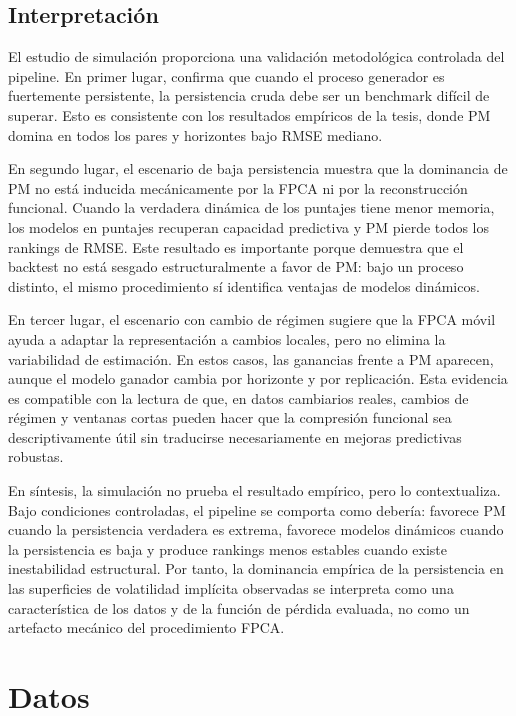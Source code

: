 \documentclass[a4paper,11pt]{article}
\newcommand{\SVIs}{superficies de volatilidad implícita}
\begin{document}
\subsection{Interpretación}

El estudio de simulación proporciona una validación metodológica controlada del pipeline. En primer lugar, confirma que cuando el proceso generador es fuertemente persistente, la persistencia cruda debe ser un benchmark difícil de superar. Esto es consistente con los resultados empíricos de la tesis, donde PM domina en todos los pares y horizontes bajo RMSE mediano.

En segundo lugar, el escenario de baja persistencia muestra que la dominancia de PM no está inducida mecánicamente por la FPCA ni por la reconstrucción funcional. Cuando la verdadera dinámica de los puntajes tiene menor memoria, los modelos en puntajes recuperan capacidad predictiva y PM pierde todos los rankings de RMSE. Este resultado es importante porque demuestra que el backtest no está sesgado estructuralmente a favor de PM: bajo un proceso distinto, el mismo procedimiento sí identifica ventajas de modelos dinámicos.

En tercer lugar, el escenario con cambio de régimen sugiere que la FPCA móvil ayuda a adaptar la representación a cambios locales, pero no elimina la variabilidad de estimación. En estos casos, las ganancias frente a PM aparecen, aunque el modelo ganador cambia por horizonte y por replicación. Esta evidencia es compatible con la lectura de que, en datos cambiarios reales, cambios de régimen y ventanas cortas pueden hacer que la compresión funcional sea descriptivamente útil sin traducirse necesariamente en mejoras predictivas robustas.

En síntesis, la simulación no prueba el resultado empírico, pero lo contextualiza. Bajo condiciones controladas, el pipeline se comporta como debería: favorece PM cuando la persistencia verdadera es extrema, favorece modelos dinámicos cuando la persistencia es baja y produce rankings menos estables cuando existe inestabilidad estructural. Por tanto, la dominancia empírica de la persistencia en las \SVIs{} observadas se interpreta como una característica de los datos y de la función de pérdida evaluada, no como un artefacto mecánico del procedimiento FPCA.

\section{Datos}
\end{document}
